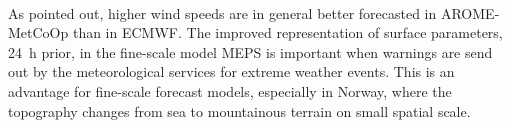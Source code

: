 \\
As \cite{muller_arome-metcoop:_2017} pointed out, higher wind speeds are in general better forecasted in AROME-MetCoOp than in ECMWF. %
The improved representation of surface parameters, \SI{24}{\hour} prior, in the fine-scale model MEPS is important when warnings are send out by the meteorological services for extreme weather events. This is an advantage for fine-scale forecast models, especially in Norway, where the topography changes from sea to mountainous terrain on small spatial scale.





